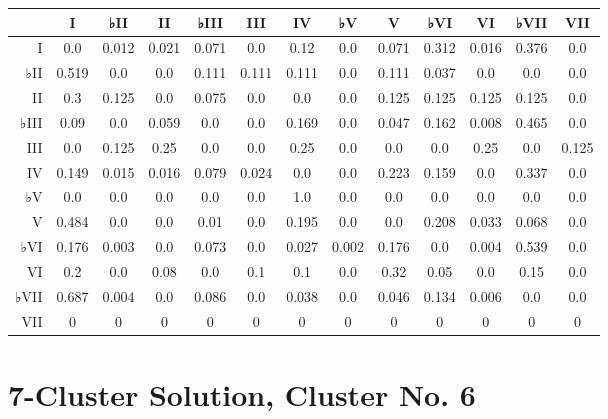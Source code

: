 \begin{table}[htbp]
\begin{minipage}{\linewidth}
\setlength{\tymax}{0.5\linewidth}
\centering
\small
\begin{tabulary}{\textwidth}{@{}RCCCCCCCCCCCC@{}} \toprule
&I&♭II&II&♭III&III&IV&♭V&V&♭VI&VI&♭VII&VII\\
\midrule
I&0.0&0.012&0.021&0.071&0.0&0.12&0.0&0.071&0.312&0.016&0.376&0.0\\
♭II&0.519&0.0&0.0&0.111&0.111&0.111&0.0&0.111&0.037&0.0&0.0&0.0\\
II&0.3&0.125&0.0&0.075&0.0&0.0&0.0&0.125&0.125&0.125&0.125&0.0\\
♭III&0.09&0.0&0.059&0.0&0.0&0.169&0.0&0.047&0.162&0.008&0.465&0.0\\
III&0.0&0.125&0.25&0.0&0.0&0.25&0.0&0.0&0.0&0.25&0.0&0.125\\
IV&0.149&0.015&0.016&0.079&0.024&0.0&0.0&0.223&0.159&0.0&0.337&0.0\\
♭V&0.0&0.0&0.0&0.0&0.0&1.0&0.0&0.0&0.0&0.0&0.0&0.0\\
V&0.484&0.0&0.0&0.01&0.0&0.195&0.0&0.0&0.208&0.033&0.068&0.0\\
♭VI&0.176&0.003&0.0&0.073&0.0&0.027&0.002&0.176&0.0&0.004&0.539&0.0\\
VI&0.2&0.0&0.08&0.0&0.1&0.1&0.0&0.32&0.05&0.0&0.15&0.0\\
♭VII&0.687&0.004&0.0&0.086&0.0&0.038&0.0&0.046&0.134&0.006&0.0&0.0\\
VII&0&0&0&0&0&0&0&0&0&0&0&0\\

\bottomrule

\end{tabulary}
\end{minipage}
\end{table}

\section{7-Cluster Solution, Cluster No. 6}
\label{7-clustersolutionclusterno.6}

